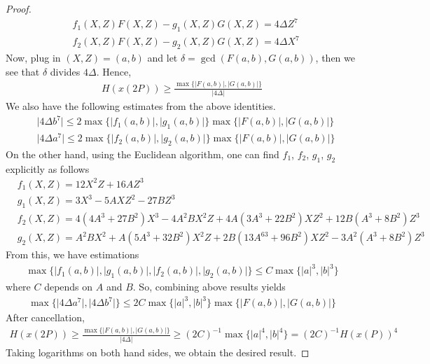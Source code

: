 \documentclass[11pt]{article}
\newcommand{\<}{\langle}
\renewcommand{\>}{\rangle}
\numberwithin{equation}{section}
\theoremstyle{plain}
\theoremstyle{definition}
\begin{document}
\begin{proof}
\begin{align*}
            &f_1(X,Z)F(X,Z)-g_1(X,Z)G(X,Z) = 4 \Delta Z^7 \\
            &f_2(X,Z)F(X,Z)-g_2(X,Z)G(X,Z) = 4 \Delta X^7
        \end{align*}
    Now, plug in \((X,Z) = (a,b)\) and let \(\delta = \gcd (F(a,b),G(a,b)) \), then we see that \(\delta\) divides \(4\Delta\). Hence, 
        \begin{align*}
            H(x(2P)) \ge \frac{\max \{ \lvert F(a,b) \rvert, \lvert G(a,b) \rvert \} } {\lvert 4\Delta \rvert}
        \end{align*}
    We also have the following estimates from the above identities.
        \begin{align*}
            &\lvert 4\Delta b^7 \rvert \le 2 \max \{\lvert f_1(a,b) \rvert, \lvert g_1(a,b) \rvert \} \max \{ \lvert F(a,b) \rvert, \lvert G(a,b) \rvert\} \\
            &\lvert 4\Delta a^7 \rvert \le 2 \max \{\lvert f_2(a,b) \rvert, \lvert g_2(a,b) \rvert \} \max \{ \lvert F(a,b) \rvert, \lvert G(a,b) \rvert\}
        \end{align*}
    On the other hand, using the Euclidean algorithm, one can find \(f_1\), \(f_2\), \(g_1\), \(g_2\) explicitly as follows
        \begin{align*}
            &f_1(X,Z) = 12 X^2Z+16AZ^3 \\
            &g_1(X,Z) = 3X^3 - 5AXZ^2 - 27BZ^3 \\
            &f_2(X,Z) = 4(4A^3+27B^2) X^3 - 4A^2BX^2Z +4A(3A^3+22B^2)XZ^2 + 12B(A^3 +8B^2)Z^3 \\
            &g_2(X,Z) = A^2BX^2 +A(5A^3+32B^2)X^2Z + 2B(13A^63+96B^2)XZ^2 - 3A^2(A^3+8B^2)Z^3 
        \end{align*}
    From this, we have estimations
        \begin{align*}
            \max \{ \lvert f_1(a,b) \rvert, \lvert g_1(a,b) \rvert, \lvert f_2(a,b) \rvert, \lvert g_2(a,b) \rvert \} \le C \max \{ \lvert a \rvert ^3, \lvert b \rvert ^3 \}
        \end{align*}
    where \(C\) depends on \(A\) and \(B\). So, combining above results yields
        \begin{align*}
             \max\{ \lvert 4\Delta a^7 \rvert, \lvert 4 \Delta b^7 \rvert \} \le 2C \max \{ \lvert a \rvert^3, \lvert b \rvert^3 \} \max \{ \lvert F(a,b) \rvert, \lvert G(a,b) \rvert \}
        \end{align*}
    After cancellation,
        \begin{align*}
            H(x(2P)) \ge \frac{\max\{\lvert F(a,b) \rvert, \lvert G(a,b) \rvert \}}{\lvert 4 \Delta \rvert} \ge (2C)^{-1} \max \{ \lvert a \rvert ^4, \lvert b \rvert ^4\} = (2C)^{-1} H(x(P))^4
        \end{align*}
    Taking logarithms on both hand sides, we obtain the desired result.
\end{proof}
\end{document}
